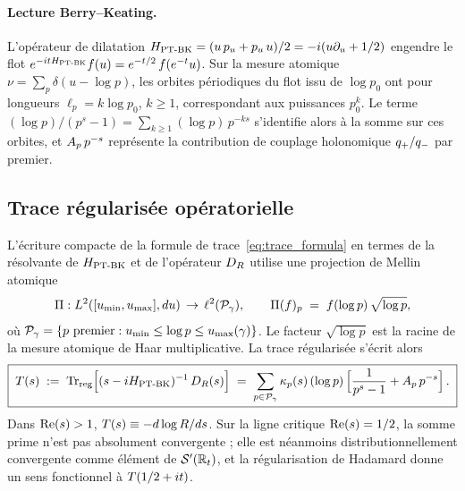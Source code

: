 \paragraph{Lecture Berry--Keating.}
L'opérateur de dilatation
$H_{\mathrm{PT\text{-}BK}} = (u\,p_u + p_u\,u)/2 = -i(u\partial_u + 1/2)$ engendre le flot
$e^{-itH_{\mathrm{PT\text{-}BK}}} f(u) = e^{-t/2}\,f(e^{-t}u)$. Sur la mesure atomique
$\nu = \sum_p \delta(u - \log p)$, les orbites périodiques du flot issu
de $\log p_0$ ont pour longueurs $\ell_p = k \log p_0$, $k \ge 1$,
correspondant aux puissances $p_0^{k}$. Le terme
$(\log p)/(p^s - 1) = \sum_{k \ge 1} (\log p)\,p^{-ks}$ s'identifie alors
à la somme sur ces orbites, et $A_p\,p^{-s}$ représente la contribution
de couplage holonomique $q_{+}/q_{-}$ par premier.

\subsection{Trace régularisée opératorielle}
\label{sec:trace_reg}

L'écriture compacte de la formule de trace~\eqref{eq:trace_formula} en
termes de la résolvante de $H_{\mathrm{PT\text{-}BK}}$ et de l'opérateur $D_R$ utilise une
projection de Mellin atomique
\begin{equation}
\Pi : L^{2}([u_{\min}, u_{\max}], du) \,\to\, \ell^{2}(\mathcal{P}_\gamma),
\qquad \Pi(f)_p \;=\; f(\log p)\,\sqrt{\log p},
\label{eq:Pi_def}
\end{equation}
où $\mathcal{P}_\gamma = \{p \text{ premier} : u_{\min} \le \log p \le
u_{\max}(\gamma)\}$. Le facteur $\sqrt{\log p}$ est la racine de la mesure
atomique de Haar multiplicative. La trace régularisée s'écrit alors
\begin{equation}
\boxed{\;
T(s) \;:=\; \operatorname{Tr}_{\mathrm{reg}}\!\Big[(s - iH_{\mathrm{PT\text{-}BK}})^{-1}\,D_R(s)\Big]
\;=\; \sum_{p \in \mathcal{P}_\gamma} \kappa_p(s)\,(\log p)\,\Big[\dfrac{1}{p^s - 1} + A_p\,p^{-s}\Big]\,.\;}
\label{eq:Treg}
\end{equation}
Dans $\operatorname{Re}(s) > 1$, $T(s) \equiv -d \log R/ds$. Sur la ligne
critique $\operatorname{Re}(s) = 1/2$, la somme prime n'est pas absolument
convergente ; elle est néanmoins distributionnellement convergente comme
élément de $\mathcal{S}'(\mathbb{R}_t)$, et la régularisation de Hadamard
donne un sens fonctionnel à $T(1/2 + it)$.

